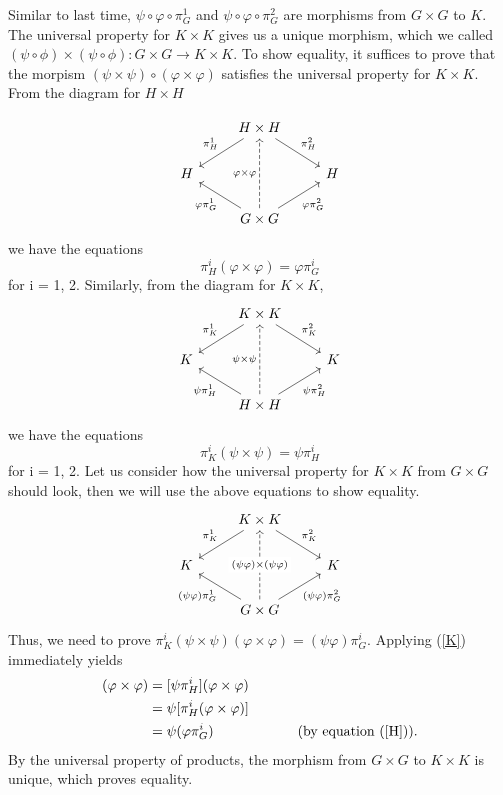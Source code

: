 \documentclass[12pt]{article}
\begin{document}
\begin{enumerate}
\begin{solution}
Similar to last time, $ \psi \circ \varphi \circ \pi^1_G$ and $ \psi \circ \varphi \circ \pi^2_G $ are morphisms from $ G \times G $ to $ K $. The universal property for $ K \times K $ gives us a unique morphism, which we called $ (\psi \circ \phi) \times (\psi \circ \phi) : G \times G \to K \times K $. To show equality, it suffices to prove that the morpism $ (\psi \times \psi) \circ (\varphi \times \varphi) $ satisfies the universal property for $ K \times K $.
From the diagram for $ H \times H $

\[ \begin{tikzcd}
		& H \times H \arrow[dr, "\pi^2_H"] \arrow[dl, "\pi^1_H"'] 								& \\
	H 	& 				 																		& H \\
	  	& G \times G \arrow[ul, "\varphi \pi^1_G"] \arrow[uu, dashed, "\varphi \times \varphi"] \arrow[ur, "\varphi \pi^2_G"'] 	&
\end{tikzcd}\]
we have the equations
\begin{equation} \label{H} 
	\pi^i_H (\varphi \times \varphi) =\varphi \pi^i_G
\end{equation}
for i = 1, 2. Similarly, from the diagram for $ K \times K $, 
\[ \begin{tikzcd}
		& K \times K \arrow[dr, "\pi^2_K"] \arrow[dl, "\pi^1_K"'] 								& \\
	K 	& 				 																		& K \\
	  	& H \times H \arrow[ul, "\psi \pi^1_H"] \arrow[uu, dashed, "\psi \times \psi"] \arrow[ur, "\psi \pi^2_H"']	&
\end{tikzcd}\]
we have the equations
\begin{equation} \label{K} 
	\pi^i_K (\psi \times \psi) =\psi \pi^i_H
\end{equation}
for i = 1, 2. Let us consider how the universal property for $ K \times K $ from $ G \times G $ should look, then we will use the above equations to show equality.
\[ \begin{tikzcd}
		& K \times K \arrow[dr, "\pi^2_K"] \arrow[dl, "\pi^1_K"'] 								& \\
	K 	& 				 																		& K \\
	  	& G \times G \arrow[ul, "(\psi \varphi) \pi^1_G"] \arrow[uu, dashed, "(\psi \varphi) \times (\psi \varphi)" description] \arrow[ur, "(\psi \varphi) \pi^2_G"']	&
\end{tikzcd}\]
Thus, we need to prove $ \pi^i_K (\psi \times \psi) (\varphi \times \varphi) = (\psi \varphi) \pi^i_G $. Applying (\ref{K}) immediately yields
\begin{align*}
 [\pi^i_K (\psi \times \psi) ](\varphi \times \varphi) &= [\psi \pi^i_H](\varphi \times \varphi)  \\
 &= \psi [\pi^i_H (\varphi \times \varphi)] \\
 &= \psi ( \varphi \pi^i_G ) \text{\hspace{2cm} (by equation (\ref{H}))}. 
\end{align*}
By the universal property of products, the morphism from $ G \times G $ to $ K \times K $ is unique, which proves equality.
\end{solution}


\end{enumerate}
\end{document}
